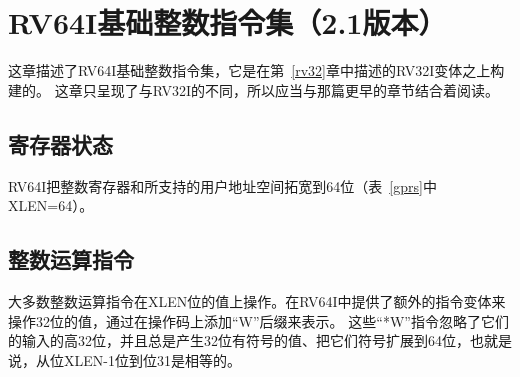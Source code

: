 \chapter{RV64I基础整数指令集（2.1版本）}
\label{rv64}

这章描述了RV64I基础整数指令集，它是在第~\ref{rv32}章中描述的RV32I变体之上构建的。
这章只呈现了与RV32I的不同，所以应当与那篇更早的章节结合着阅读。

\section{寄存器状态}

RV64I把整数寄存器和所支持的用户地址空间拓宽到64位（表~\ref{gprs}中XLEN=64）。

\section{整数运算指令}

大多数整数运算指令在XLEN位的值上操作。在RV64I中提供了额外的指令变体来操作32位的值，通过在操作码上添加“W”后缀来表示。
这些“*W”指令忽略了它们的输入的高32位，并且总是产生32位有符号的值、把它们符号扩展到64位，也就是说，从位XLEN-1位到位31是相等的。

